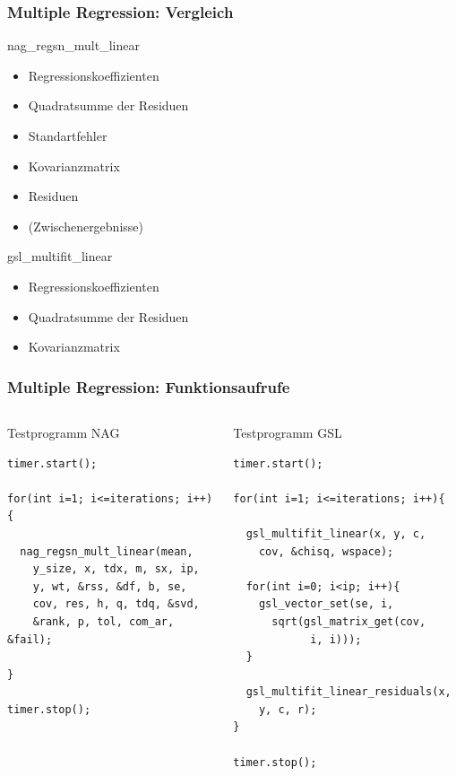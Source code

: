 \documentclass{beamer}
\begin{document}
\begin{frame}
  \frametitle{Multiple Regression: Vergleich}
  
  \begin{block}{nag\_regsn\_mult\_linear}
    \begin{itemize}
    \item Regressionskoeffizienten
    \item Quadratsumme der Residuen
    \item Standartfehler
    \item Kovarianzmatrix
    \item Residuen
    \item (Zwischenergebnisse)
    \end{itemize}
  \end{block}
  
  \begin{block}{gsl\_multifit\_linear}
    \begin{itemize}
    \item Regressionskoeffizienten
    \item Quadratsumme der Residuen
    \item Kovarianzmatrix
    \end{itemize}
  \end{block}

\end{frame}

\begin{frame}[fragile]
  \frametitle{Multiple Regression: Funktionsaufrufe}
  
  \begin{columns}
    \begin{block}{Testprogramm NAG}
      \begin{lstlisting}
timer.start();

for(int i=1; i<=iterations; i++){
  
  nag_regsn_mult_linear(mean, 
    y_size, x, tdx, m, sx, ip, 
    y, wt, &rss, &df, b, se,
    cov, res, h, q, tdq, &svd, 
    &rank, p, tol, com_ar, &fail);

}

timer.stop();
      \end{lstlisting}
    \end{block}
    \begin{block}{Testprogramm GSL}
      \begin{lstlisting}
timer.start();

for(int i=1; i<=iterations; i++){    
  
  gsl_multifit_linear(x, y, c, 
    cov, &chisq, wspace);
  
  for(int i=0; i<ip; i++){
    gsl_vector_set(se, i, 
      sqrt(gsl_matrix_get(cov, 
            i, i)));
  }
    
  gsl_multifit_linear_residuals(x, 
    y, c, r);
}

timer.stop();
\end{lstlisting}
\end{block}    
\end{columns}

\end{frame}
\end{document}
